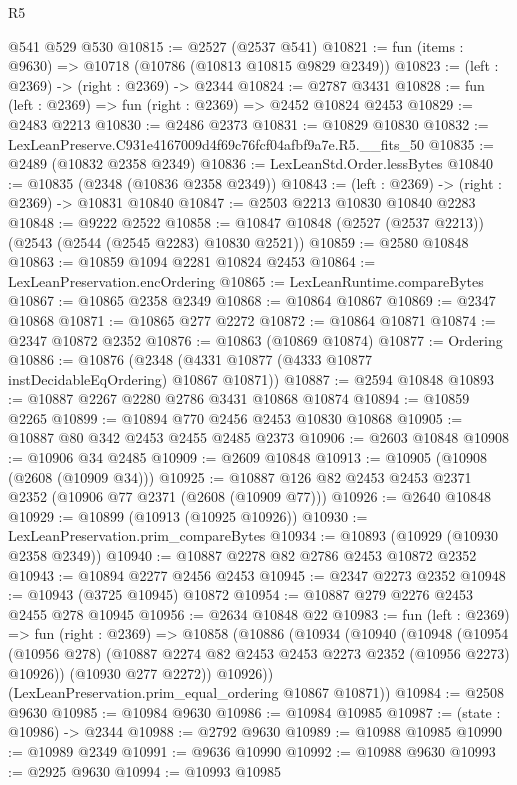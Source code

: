 \begin{lexlean}{R5}
\begin{coremodule}
    @541
    @529
    @530
@10815 := @2527 (@2537 @541)
@10821 := fun (items : @9630) => @10718 (@10786 (@10813 @10815 @9829 @2349))
@10823 := (left : @2369) -> (right : @2369) -> @2344
@10824 := @2787 @3431
@10828 := fun (left : @2369) => fun (right : @2369) => @2452 @10824 @2453
@10829 := @2483 @2213
@10830 := @2486 @2373
@10831 := @10829 @10830
@10832 := LexLeanPreserve.C931e4167009d4f69c76fcf04afbf9a7e.R5.__fits_50
@10835 := @2489 (@10832 @2358 @2349)
@10836 := LexLeanStd.Order.lessBytes
@10840 := @10835 (@2348 (@10836 @2358 @2349))
@10843 := (left : @2369) -> (right : @2369) -> @10831 @10840
@10847 := @2503 @2213 @10830 @10840 @2283
@10848 := @9222 @2522
@10858 := @10847 @10848 (@2527 (@2537 @2213)) (@2543 (@2544 (@2545 @2283) @10830 @2521))
@10859 := @2580 @10848
@10863 := @10859 @1094 @2281 @10824 @2453
@10864 := LexLeanPreservation.encOrdering
@10865 := LexLeanRuntime.compareBytes
@10867 := @10865 @2358 @2349
@10868 := @10864 @10867
@10869 := @2347 @10868
@10871 := @10865 @277 @2272
@10872 := @10864 @10871
@10874 := @2347 @10872 @2352
@10876 := @10863 (@10869 @10874)
@10877 := Ordering
@10886 := @10876 (@2348 (@4331 @10877 (@4333 @10877 instDecidableEqOrdering) @10867 @10871))
@10887 := @2594 @10848
@10893 := @10887 @2267 @2280 @2786 @3431 @10868 @10874
@10894 := @10859 @2265
@10899 := @10894 @770 @2456 @2453 @10830 @10868
@10905 := @10887 @80 @342 @2453 @2455 @2485 @2373
@10906 := @2603 @10848
@10908 := @10906 @34 @2485
@10909 := @2609 @10848
@10913 := @10905 (@10908 (@2608 (@10909 @34)))
@10925 := @10887 @126 @82 @2453 @2453 @2371 @2352 (@10906 @77 @2371 (@2608 (@10909 @77)))
@10926 := @2640 @10848
@10929 := @10899 (@10913 (@10925 @10926))
@10930 := LexLeanPreservation.prim_compareBytes
@10934 := @10893 (@10929 (@10930 @2358 @2349))
@10940 := @10887 @2278 @82 @2786 @2453 @10872 @2352
@10943 := @10894 @2277 @2456 @2453
@10945 := @2347 @2273 @2352
@10948 := @10943 (@3725 @10945) @10872
@10954 := @10887 @279 @2276 @2453 @2455 @278 @10945
@10956 := @2634 @10848 @22
@10983 := fun (left : @2369) =>
  fun (right : @2369) =>
  @10858
    (@10886
      (@10934
        (@10940
          (@10948
            (@10954 (@10956 @278) (@10887 @2274 @82 @2453 @2453 @2273 @2352 (@10956 @2273) @10926))
            (@10930 @277 @2272))
          @10926))
      (LexLeanPreservation.prim_equal_ordering @10867 @10871))
@10984 := @2508 @9630
@10985 := @10984 @9630
@10986 := @10984 @10985
@10987 := (state : @10986) -> @2344
@10988 := @2792 @9630
@10989 := @10988 @10985
@10990 := @10989 @2349
@10991 := @9636 @10990
@10992 := @10988 @9630
@10993 := @2925 @9630
@10994 := @10993 @10985

\end{coremodule}
\end{lexlean}

